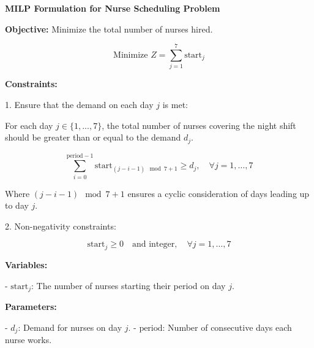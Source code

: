 \documentclass{article}
\begin{document}
\textbf{MILP Formulation for Nurse Scheduling Problem}

\textbf{Objective:}
Minimize the total number of nurses hired.

\[
\text{Minimize } Z = \sum_{j=1}^{7} \text{start}_j
\]

\textbf{Constraints:}

1. Ensure that the demand on each day \( j \) is met:

For each day \( j \in \{1,...,7\} \), the total number of nurses covering the night shift should be greater than or equal to the demand \( d_j \).

\[
\sum_{i=0}^{\text{period}-1} \text{start}_{(j-i-1) \mod 7 + 1} \geq d_j, \quad \forall j = 1, \ldots, 7
\]

Where \((j-i-1) \mod 7 + 1\) ensures a cyclic consideration of days leading up to day \( j \).

2. Non-negativity constraints:

\[
\text{start}_j \geq 0 \quad \text{and integer}, \quad \forall j = 1, \ldots, 7
\]

\textbf{Variables:}

- \(\text{start}_j\): The number of nurses starting their period on day \( j \).

\textbf{Parameters:}

- \(d_j\): Demand for nurses on day \( j \).
- \(\text{period}\): Number of consecutive days each nurse works.
\end{document}
